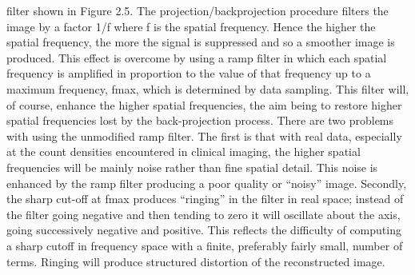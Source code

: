 \documentclass[12pt]{article}
\begin{document}
filter shown in Figure 2.5. The projection/backprojection procedure filters the image by a factor 1/f where f is the spatial frequency. Hence the higher the spatial frequency, the more the signal is suppressed and so a smoother image is produced.
This effect is overcome by using a ramp filter in which each spatial frequency is amplified in proportion to the value of that frequency up to
a maximum frequency, fmax, which is determined by data sampling. This filter will, of course, enhance the higher spatial frequencies, the aim being to restore higher spatial frequencies lost by the back-projection process. There are two problems with using the unmodified ramp filter. The first is that with real data, especially at the count densities encountered in clinical imaging, the higher spatial frequencies will be mainly noise rather than fine spatial detail. This noise is enhanced by the ramp filter producing a poor quality or “noisy” image. Secondly, the sharp cut-off at fmax produces “ringing” in the filter in real space; instead of the filter going negative and then tending to
zero it will oscillate about the axis, going successively negative and positive. This reflects the difficulty of computing a sharp cutoff in frequency space with a finite, preferably fairly small, number of terms. Ringing will produce structured distortion of the reconstructed image.
\end{document}

